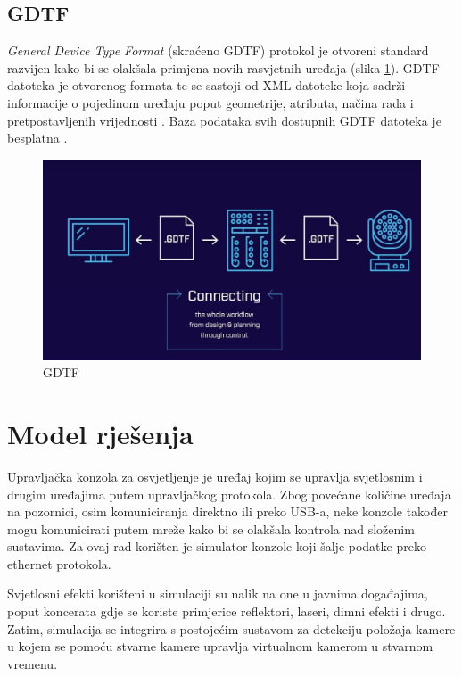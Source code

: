 \documentclass[times, utf8, zavrsni, numeric]{fer}
\begin{document}
\section{GDTF}
\emph{General Device Type Format} (skraćeno GDTF) protokol je otvoreni standard razvijen kako bi se olakšala primjena novih rasvjetnih uređaja (slika \ref{fig:slika 3-5}). GDTF datoteka je otvorenog formata te se sastoji od XML datoteke koja sadrži informacije o pojedinom uređaju poput geometrije, atributa, načina rada i pretpostavljenih vrijednosti \cite{dmx_gdtf}. Baza podataka svih dostupnih GDTF datoteka je besplatna \cite{GDTF}.\\

\begin{figure}[htp]
	\centering
	\includegraphics[width=\linewidth]{slika 3-5.png}
	\caption{GDTF \cite{GDTF}}
	\label{fig:slika 3-5}
\end{figure}

\chapter{Model rješenja}
Upravljačka konzola za osvjetljenje je uređaj kojim se upravlja svjetlosnim i drugim uređajima putem upravljačkog protokola. Zbog povećane količine uređaja na pozornici, osim komuniciranja direktno ili preko USB-a, neke konzole također mogu komunicirati putem mreže kako bi se olakšala kontrola nad složenim sustavima. Za ovaj rad korišten je simulator konzole koji šalje podatke preko ethernet protokola.\newline

Svjetlosni efekti korišteni u simulaciji su nalik na one u javnima događajima, poput koncerata gdje se koriste primjerice reflektori, laseri, dimni efekti i drugo.
Zatim, simulacija se integrira s postojećim sustavom za detekciju položaja kamere u kojem se pomoću stvarne kamere upravlja virtualnom kamerom u stvarnom vremenu.
\end{document}
